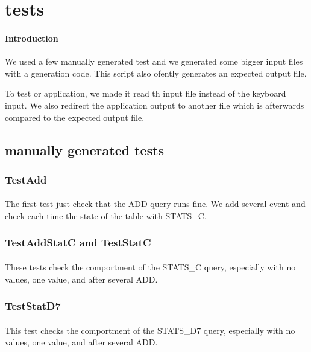 \section{tests}

\paragraph{Introduction}
We used a few manually generated test and we generated some bigger input files with a generation code.
This script also ofently generates an expected output file.

To test or application, we made it read th input file instead of the keyboard input. We also redirect the application output to another file which is afterwards compared to the expected output file.

\subsection{manually generated tests}

\subsubsection{TestAdd}
\paragraph{}
The first test just check that the ADD query runs fine. We add several event and check each time the state of the table with STATS\_C.

\subsubsection{TestAddStatC and TestStatC}
\paragraph{}
These tests check the comportment of the STATS\_C query, especially with no values, one value, and after several ADD.

\subsubsection{TestStatD7}
\paragraph{}
This test checks the comportment of the STATS\_D7 query, especially with no values, one value, and after several ADD.

